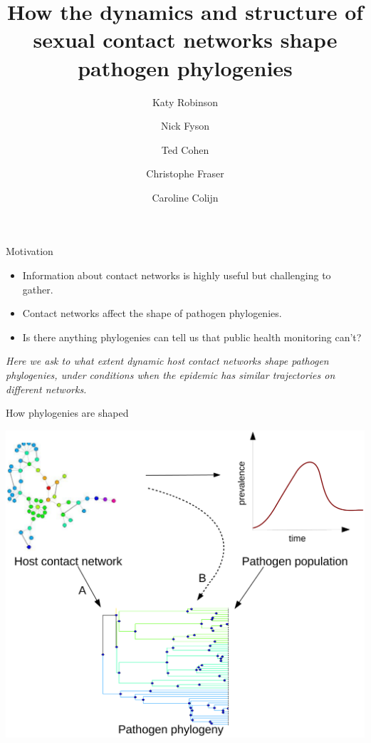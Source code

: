 \documentclass{beamer}
\title{How the dynamics and structure of sexual contact networks shape pathogen
       phylogenies}
\author[Robinson et al.]{Katy Robinson \and Nick Fyson \and Ted Cohen \and
Christophe Fraser \and Caroline Colijn}
\begin{document}

\maketitle

\begin{frame}{Motivation}
    \begin{itemize}
        \item Information about contact networks is highly useful but
            challenging to gather.
        \item Contact networks affect the shape of pathogen phylogenies.
        \item Is there anything phylogenies can tell us that public health
            monitoring can't?
    \end{itemize}
    \begin{center}
        \itshape
        Here we ask to what extent dynamic host contact networks shape pathogen
        phylogenies, under conditions when the epidemic has similar
        trajectories on different networks.
        \normalfont
    \end{center}
\end{frame}

\begin{frame}{How phylogenies are shaped}
    \vspace{-0.5cm}
    \begin{center}
        \includegraphics[height=0.8\textheight]{f1}
    \end{center}
\end{frame}
\end{document}
